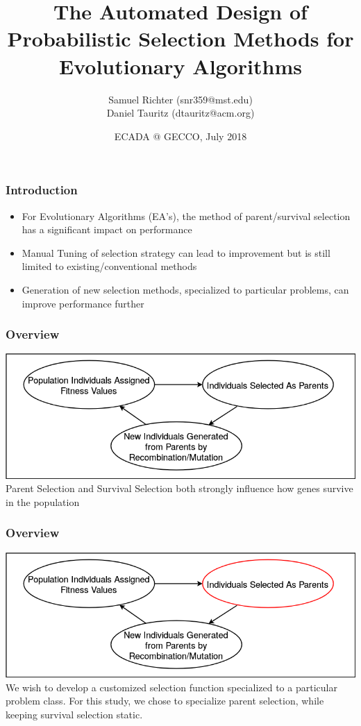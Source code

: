 \documentclass{beamer}
\title[Automated Design of Probabilistic Selection Methods for EA's]
{The Automated Design of Probabilistic Selection Methods for Evolutionary Algorithms}
\author[Richter, Samuel \& Tauritz, Daniel] %
{Samuel Richter (snr359@mst.edu) \\Daniel Tauritz (dtauritz@acm.org)}
\institute %
{
  Natural Computation Laboratory\\
  Department of Computer Science\\
  Missouri University of Science and Technology\\
  Rolla, Missouri 65409
}
\date{ECADA @ GECCO, July 2018}
\begin{document}
 
	\frame{\titlepage}
	
	\begin{frame}
		\frametitle{Introduction}
		
		\begin{itemize}
			 \item<1-|alert@1> For Evolutionary Algorithms (EA's), the method of parent/survival selection has a significant impact on performance
			 \item<2-|alert@2> Manual Tuning of selection strategy can lead to improvement but is still limited to existing/conventional methods
			 \item<3-|alert@3> Generation of new selection methods, specialized to particular problems, can improve performance further
		\end{itemize}
	\end{frame}
	
	\begin{frame}
		\frametitle{Overview}
			\includegraphics[width=1\textwidth]{ea_cycle}
			\\
			Parent Selection and Survival Selection both strongly influence how genes survive in the population
	\end{frame}
	
	\begin{frame}
		\frametitle{Overview}
			\includegraphics[width=1\textwidth]{ea_cycle_highlight}
			\\
			We wish to develop a customized selection function specialized to a particular problem class. For this study, we chose to specialize parent selection, while keeping survival selection static.
	\end{frame}
	
\end{document}

